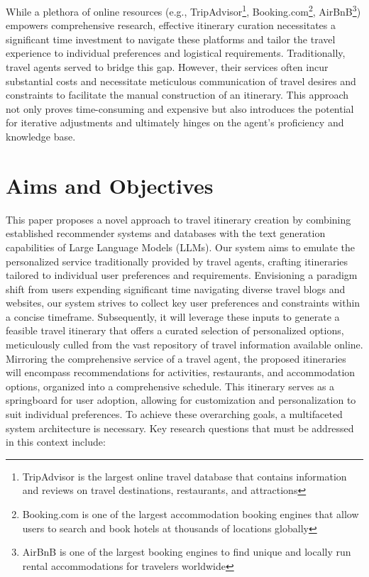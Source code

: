 \documentclass[12pt,a4paper]{report}
\begin{document}
While a plethora of online resources (e.g., TripAdvisor\footnote{TripAdvisor is the largest online travel database that contains information and reviews on travel destinations, restaurants, and attractions}, Booking.com\footnote{Booking.com is one of the largest accommodation booking engines that allow users to search and book hotels at thousands of locations globally}, AirBnB\footnote{AirBnB is one of the largest booking engines to find unique and locally run rental accommodations for travelers worldwide}) empowers comprehensive research, effective itinerary curation necessitates a significant time investment to navigate these platforms and tailor the travel experience to individual preferences and logistical requirements. Traditionally, travel agents served to bridge this gap. However, their services often incur substantial costs and necessitate meticulous communication of travel desires and constraints to facilitate the manual construction of an itinerary. This approach not only proves time-consuming and expensive but also introduces the potential for iterative adjustments and ultimately hinges on the agent's proficiency and knowledge base.


\section{Aims and Objectives}


This paper proposes a novel approach to travel itinerary creation by combining established recommender systems and databases with the text generation capabilities of Large Language Models (LLMs). Our system aims to emulate the personalized service traditionally provided by travel agents, crafting itineraries tailored to individual user preferences and requirements.
Envisioning a paradigm shift from users expending significant time navigating diverse travel blogs and websites, our system strives to collect key user preferences and constraints within a concise timeframe. Subsequently, it will leverage these inputs to generate a feasible travel itinerary that offers a curated selection of personalized options, meticulously culled from the vast repository of travel information available online.
Mirroring the comprehensive service of a travel agent, the proposed itineraries will encompass recommendations for activities, restaurants, and accommodation options, organized into a comprehensive schedule. This itinerary serves as a springboard for user adoption, allowing for customization and personalization to suit individual preferences.
To achieve these overarching goals, a multifaceted system architecture is necessary. Key research questions that must be addressed in this context include:
\end{document}
